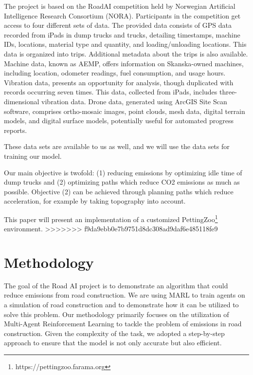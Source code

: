 \documentclass[conference]{IEEEtran}
\begin{document}
	The project is based on the RoadAI competition held by Norwegian Artificial Intelligence Research
	Consortium (NORA)\cite{noraRoadAIReducing}. Participants in the competition get access to four
	different sets of data. The provided data consists of GPS data recorded from iPads in dump trucks and
	trucks, detailing timestamps, machine IDs, locations, material type and quantity, and loading/unloading
	locations. This data is organized into trips. Additional metadata about the trips is also available.
	Machine data, known as AEMP, offers information on Skanska-owned machines, including location,
	odometer readings, fuel consumption, and usage hours. Vibration data, presents an opportunity for analysis, though duplicated with records occurring seven times. This data, collected from
	iPads, includes three-dimensional vibration data. Drone data, generated using ArcGIS Site Scan software,
	comprises ortho-mosaic images, point clouds, mesh data, digital terrain models, and digital surface models,
	potentially useful for automated progress reports.

	These data sets are available to us as well, and we will use the data sets for training our model.

	Our main objective is twofold: (1) reducing emissions by optimizing idle time of dump trucks and (2)
	optimizing paths which reduce CO2 emissions as much as possible. Objective (2) can be achieved through
	planning paths which reduce acceleration, for example by taking topography into account.

	This paper will present an implementation of a customized PettingZoo\footnote{https://pettingzoo.farama.org}
	environment.
>>>>>>> f9da9ebb0e7b9751d8dc308ad9daf6e485118fe9


	\section{Methodology}

	The goal of the Road AI project is to demonstrate an algorithm that could reduce emissions from road construction.
	We are using MARL to train agents on a simulation of road construction and to demonstrate how it can be utilized to solve this problem.
	Our methodology primarily focuses on the utilization of Multi-Agent Reinforcement Learning to tackle the problem of emissions in road construction. Given the complexity of the task, we adopted a step-by-step approach to ensure that the model is not only accurate but also efficient.
\end{document}

